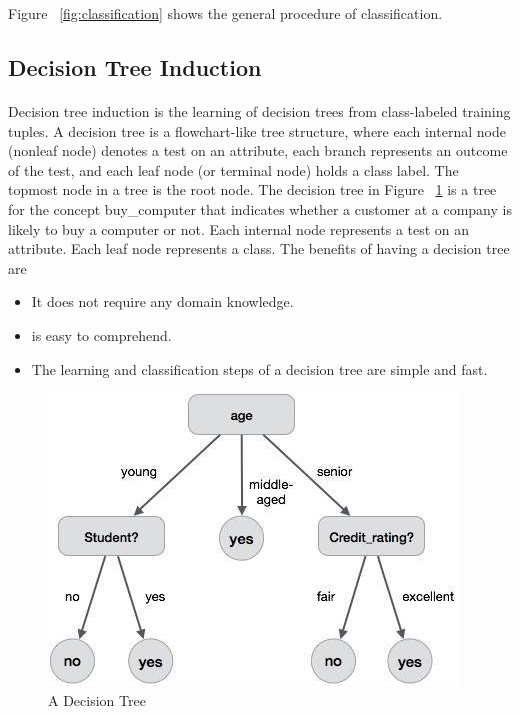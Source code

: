 Figure ~\ref{fig:classification} shows the general procedure of classification.
\subsection{Decision Tree Induction}
\paragraph{}
Decision tree induction is the learning of decision trees from class-labeled training tuples. A decision tree is a
flowchart-like tree structure, where each internal node (nonleaf node) denotes a test on an attribute, each
branch represents an outcome of the test, and each leaf node (or terminal node) holds a class label. The
topmost node in a tree is the root node. 
The decision tree in Figure ~\ref{fig:decisiontree} is a tree for the concept buy\_computer that indicates whether a customer at a company is likely to buy a computer or not. Each internal node represents a test on an attribute. Each leaf node represents a class.
The benefits of having a decision tree are 
\begin{itemize}
\item It does not require any domain knowledge.
\item is easy to comprehend.
\item The learning and classification steps of a decision tree are simple and fast.
\end{itemize}
    

\begin{figure}
   \centering
  \includegraphics[width=\linewidth]{Figures/dm_decision_tree.jpg}
  \decoRule
  \caption[A Decision Tree]{A Decision Tree}
  \label{fig:decisiontree}
\end{figure}


